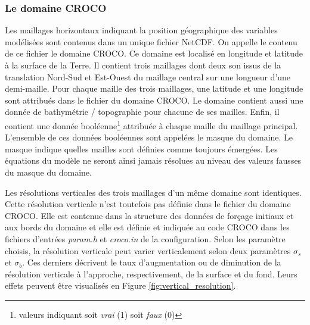 \documentclass[10pt,a4paper,titlepage]{article}
\begin{document}
\subsubsection{Le domaine CROCO}
\label{subsub:grille_croco}
Les maillages horizontaux indiquant la position géographique des variables modélisées sont contenus dans un unique fichier NetCDF.
On appelle le contenu de ce fichier le domaine CROCO.
Ce domaine est localisé en longitude et latitude à la surface de la Terre.
Il contient trois maillages dont deux son issus de la translation Nord-Sud et Est-Ouest du maillage central sur une longueur d'une demi-maille.
Pour chaque maille des trois maillages, une latitude et une longitude sont attribués dans le fichier du domaine CROCO.
Le domaine contient aussi une donnée de bathymétrie / topographie pour chacune de ses mailles.
Enfin, il contient une donnée booléenne\footnote{valeurs indiquant soit \textit{vrai} (1) soit \textit{faux} (0)} attribuée à chaque maille du maillage principal.
L'ensemble de ces données booléennes sont appelées le masque du domaine.
Le masque indique quelles mailles sont définies comme toujours émergées.
Les équations du modèle ne seront ainsi jamais résolues au niveau des valeurs fausses du masque du domaine.

Les résolutions verticales des trois maillages d'un même domaine sont identiques.
Cette résolution verticale n'est toutefois pas définie dans le fichier du domaine CROCO.
Elle est contenue dans la structure des données de forçage initiaux et aux bords du domaine et elle est définie et indiquée au code CROCO dans les fichiers d'entrées \textit{param.h} et \textit{croco.in} de la configuration.
Selon les paramètre choisis, la résolution verticale peut varier verticalement selon deux paramètres $\sigma_{s}$ et $\sigma_{b}$.
Ces derniers décrivent le taux d'augmentation ou de diminution de la résolution verticale à l'approche, respectivement, de la surface et du fond.
Leurs effets peuvent être visualisés en Figure \ref{fig:vertical_resolution}.
\end{document}
